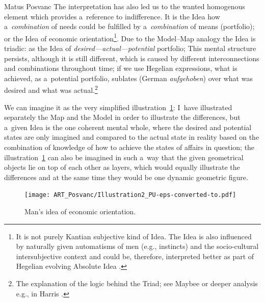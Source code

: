 \begin{artengenv}{Matus Posvanc}
The interpretation has also led us to the wanted homogenous element which provides a~reference to indifference. It is the Idea how a~\textit{combination} of needs could be fulfilled by a~\textit{combination} of means (portfolio); or the Idea of economic orientation\footnote{It is not purely Kantian subjective kind of Idea. The Idea is also influenced by naturally given automatisms of men (e.g., instincts) and the socio-cultural intersubjective context and could be, therefore, interpreted better as part of Hegelian evolving Absolute Idea 
\parencite[see interpretation of Hegelian logic by][]{Harris1983Interpretation}. %
 }. Due to the Model–Map analogy the Idea is triadic: as the Idea of \textit{desired---actual---potential} portfolio; This mental structure persists, although it is still different, which is caused by different interconnections and combinations throughout time; if we use Hegelian expressions, what is achieved, as a~potential portfolio, sublates (German \textit{aufgehoben}) over what was desired and what was actual.\footnote{The explanation of the logic behind the Triad; see Maybee 
\parencite*[][]{Maybee2020Hegels} %
 or deeper analysis e.g., in Harris 
\parencite*[][]{Harris1983Interpretation}.%
}



We can imagine it as the very simplified illustration~\ref{pos:fig2}: I~have illustrated separately the Map and the Model in order to illustrate the differences, but a~given Idea is the one coherent mental whole, where the desired and potential states are only imagined and compared to the actual state in reality based on the combination of knowledge of how to achieve the states of affairs in question; the illustration~\ref{pos:fig2} can also be imagined in such a~way that the given geometrical objects lie on top of each other as layers, which would equally illustrate the differences and at the same time they would be one dynamic geometric figure.


\begin{figure}
 \begin{center}
 \texttt{[image: ART\_Posvanc/Illustration2\_PU-eps-converted-to.pdf]}%
 \end{center}%
 \caption{Man's idea of economic orientation.}\label{pos:fig2}
\end{figure}







\end{artengenv}
